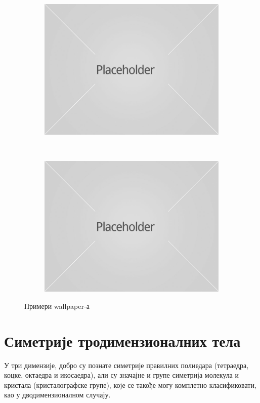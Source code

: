\documentclass{report}
\theoremstyle{plain}
\theoremstyle{definition}
\begin{document}
\begin{figure}[h]
\centering
\begin{subfigure}{0.4\textwidth}
\includegraphics[width=\textwidth]{placeholder}
\end{subfigure}
~
\begin{subfigure}{0.4\textwidth}
\includegraphics[width=\textwidth]{placeholder}
\end{subfigure}
\caption{Примери wallpaper-а}
\end{figure}

\section{Симетрије тродимензионалних тела}
У три димензије, добро су познате симетрије правилних полиедара (тетраедра, коцке, октаедра и икосаедра), али су значајне и групе симетрија молекула и кристала (кристалографске групе), које се такође могу комплетно класификовати, као у дводимензионалном случају.
\end{document}

